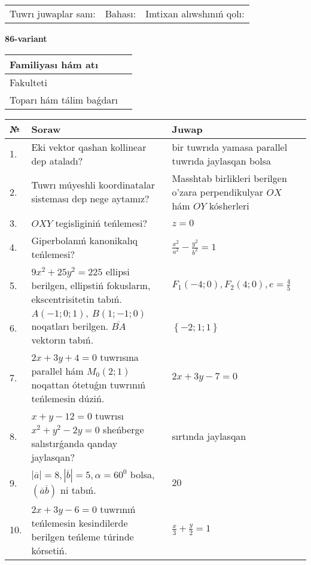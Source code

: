 \documentclass{article}
\begin{document}
\vspace{1cm}

\begin{tabular}{lll}
Tuwrı juwaplar sanı: \underline{\hspace{1.5cm}} & 
Bahası: \underline{\hspace{1.5cm}} & 
Imtixan alıwshınıń qolı: \underline{\hspace{2cm}} \\
\end{tabular}

\egroup

\newpage


\textbf{86-variant}\\

\bgroup
\def\arraystretch{1.6} %

\begin{tabular}{|m{5.7cm}|m{9.5cm}|}
\hline
Familiyası hám atı & \\
\hline
Fakulteti  & \\
\hline
Toparı hám tálim baǵdarı  & \\
\hline
\end{tabular}

\vspace{1cm}

\begin{tabular}{|m{0.7cm}|m{10cm}|m{4cm}|}
\hline
№ & Soraw & Juwap \\
\hline
1. & Eki vektor qashan kollinear dep ataladı? & bir tuwrıda yamasa parallel tuwrıda jaylasqan bolsa \\
\hline
2. & Tuwrı múyeshli koordinatalar sisteması dep nege aytamız? & Masshtab birlikleri berilgen o'zara perpendikulyar $OX$ hám $OY$ kósherleri \\
\hline
3. & $OXY$ tegisliginiń teńlemesi? & $z=0$ \\
\hline
4. & Giperbolanıń kanonikalıq teńlemesi? & $\frac{x^2}{a^2}-\frac{y^2}{b^2}=1$ \\
\hline
5. & $9x^{2}+25y^{2}=225$ ellipsi berilgen, ellipstiń fokusların, ekscentrisitetin tabıń. & $F_1\left(-4;0 \right) , F_2\left( 4;0 \right) , e = \frac{4}{5}$ \\
\hline
6. & $A (-1;0;1),\ B (1;-1;0)$ noqatları berilgen. $\overline{BA}$ vektorın tabıń. & $\left\{ - 2;1;1 \right\}$ \\
\hline
7. & $2x+3y+4=0$ tuwrısına parallel hám $M_{0} (2;1)$ noqattan ótetuǵın tuwrınıń teńlemesin dúziń. & $2x+3y-7=0$ \\
\hline
8. & $x+y-12=0$ tuwrısı $x^{2}+y^{2}-2y=0$ sheńberge salıstırǵanda qanday jaylasqan? & sırtında jaylasqan \\
\hline
9. & $\left| \overline{a} \right|=8, \left| \overline{b} \right|=5, \alpha=60^{0}$ bolsa, $( \overline{a}\overline{b} )$ ni tabıń. & $20$ \\
\hline
10. & $2x+3y-6=0$ tuwrınıń teńlemesin kesindilerde berilgen teńleme túrinde kórsetiń. & $\frac{x}{3} + \frac{ y }{ 2 } =  1$ \\
\hline
\end{tabular}
\end{document}
